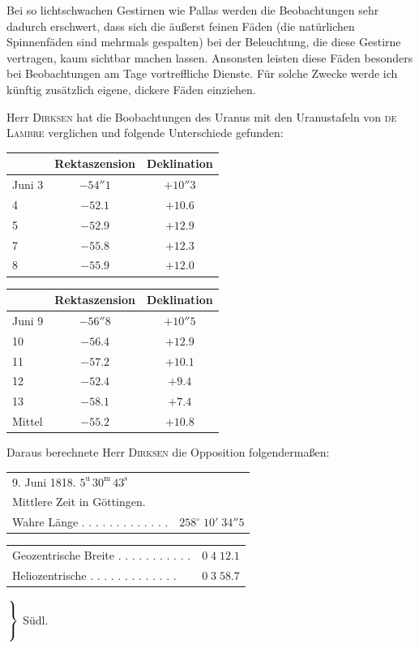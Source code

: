 \par\indent Bei so lichtschwachen Gestirnen wie Pallas werden die Beobachtungen sehr dadurch erschwert, dass sich die äußerst feinen Fäden (die natürlichen Spinnenfäden sind mehrmals gespalten) bei der Beleuchtung, die diese Gestirne vertragen, kaum sichtbar machen lassen. Ansonsten leisten diese Fäden besonders bei Beobachtungen am Tage vortreffliche Dienste. Für solche Zwecke werde ich künftig zusätzlich eigene, dickere Fäden einziehen.

\par\indent Herr \textsc{Dirksen} hat die Boobachtungen des Uranus mit den Uranustafeln von \textsc{de Lambre} verglichen und folgende Unterschiede gefunden: 

\begin{center}
\begin{tabular}{l|c|c}
 & Rektaszension & Deklination \\
\hline
Juni 3 & $-54''1$ & $+10''3$ \\
4 & $-52.1$ & $+10.6$ \\
5 & $-52.9$ & $+12.9$ \\
7 & $-55.8$ & $+12.3$ \\
8 & $-55.9$ & $+12.0$ \\
\end{tabular}
\par\medskip
\begin{tabular}{l|c|c}
 & Rektaszension & Deklination \\
\hline
Juni 9 & $-56''8$ & $+10''5$ \\
10 & $-56.4$ & $+12.9$ \\
11 & $-57.2$ & $+10.1$ \\
12 & $-52.4$ & $+9.4$ \\
13 & $-58.1$ & $+7.4$ \\
Mittel & $-55.2$ & $+10.8$ \\
\end{tabular}
\end{center}

\par\indent Daraus berechnete Herr \textsc{Dirksen} die Opposition folgendermaßen:

\begin{center}
\begin{tabular}{ll}
\multicolumn{2}{l}{9. Juni 1818. $5^{\mathrm u}\,30^{\mathrm m}\,43^{\mathrm s}$} \\
\multicolumn{2}{l}{Mittlere Zeit in Göttingen.} \\
Wahre Länge . . . . . . . . . . . . . & $258^\circ\;10'\;34''5$ \\
\end{tabular}\par\smallskip
\begin{tabular}{ll}
Geozentrische Breite . . . . . . . . . . . & $0\;4\;12.1$ \\
Heliozentrische . . . . . . . . . . . . . & $0\;3\;58.7$ \\
\end{tabular} $\left.\rule{0pt}{2.2em}\right\}$ Südl.
\end{center}

